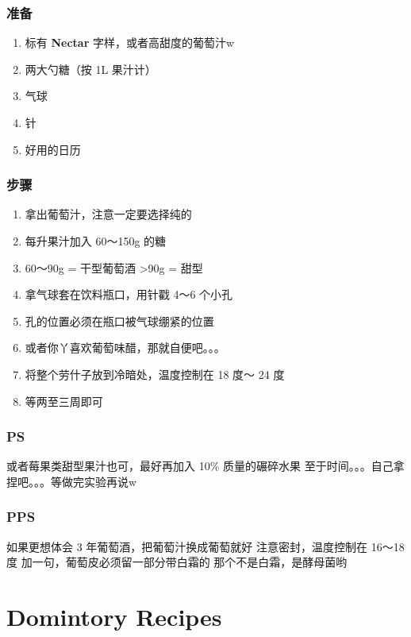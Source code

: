 \documentclass[12pt, a4paper]{ctexart}
\begin{document}
\subsubsection{准备}
\begin{enumerate}
    \item{标有 \textbf{Nectar} 字样，或者高甜度的葡萄汁w}
    \item{两大勺糖（按 1L 果汁计）}
    \item{气球}
    \item{针}
    \item{好用的日历}
\end{enumerate}

\subsubsection{步骤}
\begin{enumerate}
    \item{拿出葡萄汁，注意一定要选择纯的}
    \item{每升果汁加入 60～150g 的糖}
    \item{60～90g = 干型葡萄酒 >90g = 甜型}
    \item{拿气球套在饮料瓶口，用针戳 4～6 个小孔}
    \item{孔的位置必须在瓶口被气球绷紧的位置}
    \item{或者你丫喜欢葡萄味醋，那就自便吧。。。}
    \item{将整个劳什子放到冷暗处，温度控制在 18 度～ 24 度}
    \item{等两至三周即可}
\end{enumerate}

\subsubsection{PS}
或者莓果类甜型果汁也可，最好再加入 10\% 质量的碾碎水果
至于时间。。。自己拿捏吧。。。等做完实验再说w

\subsubsection{PPS}
如果更想体会 3 年葡萄酒，把葡萄汁换成葡萄就好
注意密封，温度控制在 16～18 度
加一句，葡萄皮必须留一部分带白霜的
那个不是白霜，是酵母菌哟

\newpage
\section{Domintory Recipes}
\end{document}
